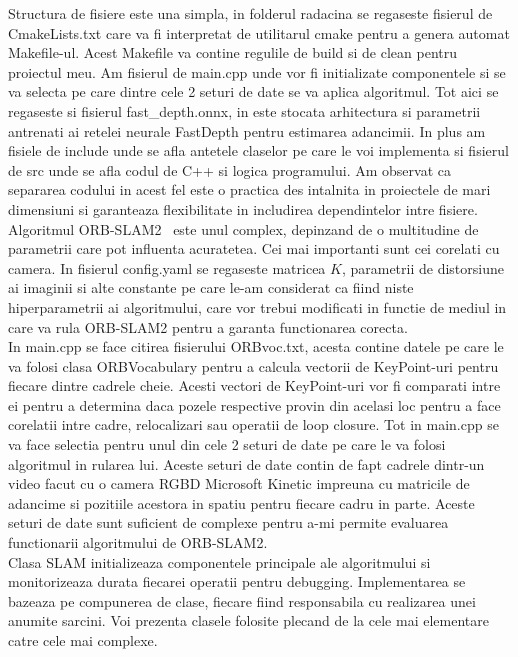 \documentclass[12pt,a4paper]{report}
\begin{document}
Structura de fisiere este una simpla, in folderul radacina se regaseste fisierul de 
CmakeLists.txt care va fi interpretat de utilitarul cmake pentru a genera automat Makefile-ul. 
Acest Makefile va contine regulile de build si de clean pentru proiectul meu. Am fisierul de 
main.cpp unde vor fi initializate componentele si se va selecta pe care dintre cele 2 seturi
de date se va aplica algoritmul. Tot aici se regaseste si fisierul fast\_depth.onnx, in este 
stocata arhitectura si parametrii antrenati ai retelei neurale FastDepth pentru estimarea 
adancimii. In plus am fisiele de include unde se afla antetele claselor pe care le voi 
implementa si fisierul de src unde se afla codul de C++ si logica programului. Am observat ca 
separarea codului in acest fel este o practica des intalnita in proiectele de mari dimensiuni 
si garanteaza flexibilitate in includirea dependintelor intre fisiere. Algoritmul ORB-SLAM2 \
este unul complex, depinzand de o multitudine de parametrii care pot influenta acuratetea.
Cei mai importanti sunt cei corelati cu camera. In fisierul config.yaml se regaseste matricea \(K\), 
parametrii de distorsiune ai imaginii si alte constante pe care le-am considerat ca fiind niste
hiperparametrii ai algoritmului, care vor trebui modificati in functie de mediul in care va rula
ORB-SLAM2 pentru a garanta functionarea corecta. \\

In main.cpp se face citirea fisierului ORBvoc.txt, acesta contine datele pe care le va folosi
clasa ORBVocabulary pentru a calcula vectorii de KeyPoint-uri pentru fiecare dintre cadrele cheie.
Acesti vectori de KeyPoint-uri vor fi comparati intre ei pentru a determina daca pozele respective 
provin din acelasi loc pentru a face corelatii intre cadre, relocalizari sau operatii de loop
closure. Tot in main.cpp se va face selectia pentru unul din cele 2 seturi de date pe care le va
folosi algoritmul in rularea lui. Aceste seturi de date contin de fapt cadrele dintr-un video 
facut cu o camera RGBD Microsoft Kinetic impreuna cu matricile de adancime si pozitiile acestora
in spatiu pentru fiecare cadru in parte. Aceste seturi de date sunt suficient de complexe pentru 
a-mi permite evaluarea functionarii algoritmului de ORB-SLAM2. \\

Clasa SLAM initializeaza componentele principale ale algoritmului si monitorizeaza durata 
fiecarei operatii pentru debugging. Implementarea se bazeaza pe compunerea de clase, fiecare 
fiind responsabila cu realizarea unei anumite sarcini. Voi prezenta clasele folosite plecand 
de la cele mai elementare catre cele mai complexe. \\
\end{document}
